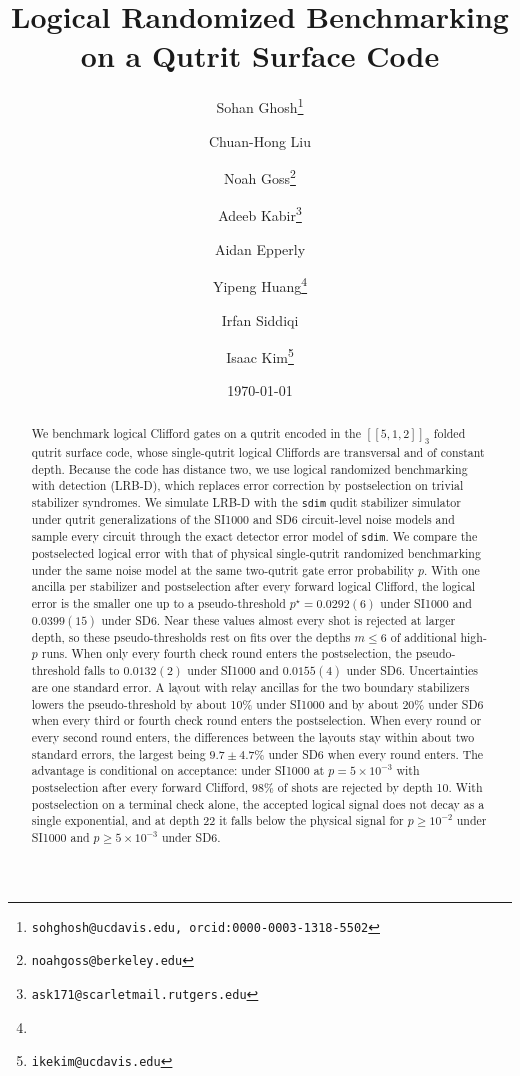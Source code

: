 \documentclass[final]{article}
\title{Logical Randomized Benchmarking on a Qutrit Surface Code}
\author[1]{Sohan Ghosh\thanks{\texttt{sohghosh@ucdavis.edu, orcid:0000-0003-1318-5502}}}
\author[2]{Chuan-Hong Liu}
\author[2]{Noah Goss\thanks{\texttt{noahgoss@berkeley.edu}}}
\author[3]{Adeeb Kabir\thanks{\texttt{ask171@scarletmail.rutgers.edu}}}
\author[1]{Aidan Epperly}
\author[3]{Yipeng Huang\thanks{\texttt{}}}
\author[2]{Irfan Siddiqi}
\author[1]{Isaac Kim\thanks{\texttt{ikekim@ucdavis.edu}}}
\affil[1]{Department of Physics and Astronomy, University of California Davis, Davis, CA}
\affil[2]{Quantum Nanoelectronics Laboratory, University of California, Berkeley, CA}
\affil[3]{Department of Computer Science, Rutgers University, New Brunswick, New Jersey}
\date{\today}
\begin{document}
\maketitle

\begin{abstract}
We benchmark logical Clifford gates on a qutrit encoded in the $[[5,1,2]]_3$ folded qutrit surface code, whose single-qutrit logical Cliffords are transversal and of constant depth. Because the code has distance two, we use logical randomized benchmarking with detection (LRB-D), which replaces error correction by postselection on trivial stabilizer syndromes. We simulate LRB-D with the \texttt{sdim} qudit stabilizer simulator under qutrit generalizations of the SI1000 and SD6 circuit-level noise models and sample every circuit through the exact detector error model of \texttt{sdim}. We compare the postselected logical error with that of physical single-qutrit randomized benchmarking under the same noise model at the same two-qutrit gate error probability $p$.
With one ancilla per stabilizer and postselection after every forward logical Clifford, the logical error is the smaller one up to a pseudo-threshold $p^\star = 0.0292(6)$ under SI1000 and $0.0399(15)$ under SD6.
Near these values almost every shot is rejected at larger depth, so these pseudo-thresholds rest on fits over the depths $m \le 6$ of additional high-$p$ runs.
When only every fourth check round enters the postselection, the pseudo-threshold falls to $0.0132(2)$ under SI1000 and $0.0155(4)$ under SD6. Uncertainties are one standard error.
A layout with relay ancillas for the two boundary stabilizers lowers the pseudo-threshold by about 10\% under SI1000 and by about 20\% under SD6 when every third or fourth check round enters the postselection. When every round or every second round enters, the differences between the layouts stay within about two standard errors, the largest being $9.7 \pm 4.7\%$ under SD6 when every round enters.
The advantage is conditional on acceptance: under SI1000 at $p = 5\times 10^{-3}$ with postselection after every forward Clifford, $98\%$ of shots are rejected by depth 10.
With postselection on a terminal check alone, the accepted logical signal does not decay as a single exponential, and at depth 22 it falls below the physical signal for $p \geq 10^{-2}$ under SI1000 and $p \geq 5\times 10^{-3}$ under SD6.
\end{abstract}
\end{document}
